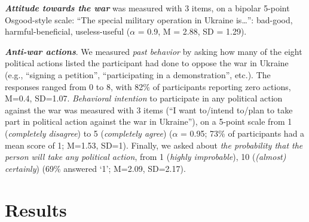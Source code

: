 \documentclass[
]{article}
\begin{document}
\textbf{\emph{Attitude towards the war}} was measured with 3 items, on a bipolar 5-point Osgood-style scale: ``The special military operation in Ukraine is\ldots{}'': bad-good, harmful-beneficial, useless-useful (\(\alpha\) = 0.9, M = 2.88, SD = 1.29).

\textbf{\emph{Anti-war actions}}. We measured \emph{past behavior} by asking how many of the eight political actions listed the participant had done to oppose the war in Ukraine (e.g., ``signing a petition'', ``participating in a demonstration'', etc.). The responses ranged from 0 to 8, with 82\% of participants reporting zero actions, M=0.4, SD=1.07. \emph{Behavioral intention} to participate in any political action against the war was measured with 3 items (``I want to/intend to/plan to take part in political action against the war in Ukraine''), on a 5-point scale from 1 (\emph{completely disagree}) to 5 (\emph{completely agree}) (\(\alpha\) = 0.95; 73\% of participants had a mean score of 1; M=1.53, SD=1). Finally, we asked about \emph{the probability that the person will take any political action}, from 1 (\emph{highly improbable}), 10 (\emph{(almost) certainly}) (69\% answered `1'; M=2.09, SD=2.17).

\allsectionsfont{\centering}

\section*{Results}\label{results}
\end{document}
